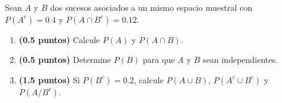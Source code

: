 
Sean $A$ y $B$ dos sucesos asociados a un mismo espacio muestral con
$P(A^c)=0.4$ y $P(A\cap B^c)=0.12$.
\begin{enumerate}[label=\alph*)]
  \item \textbf{(0.5 puntos)} Calcule $P(A)$ y $P(A\cap B)$.
  \item \textbf{(0.5 puntos)} Determine $P(B)$ para que $A$ y $B$ sean independientes.
  \item \textbf{(1.5 puntos)} Si $P(B^c)=0.2$, calcule $P(A\cup B)$,
  $P(A^c\cup B^c)$ y $P(A/B^c)$.
\end{enumerate}
